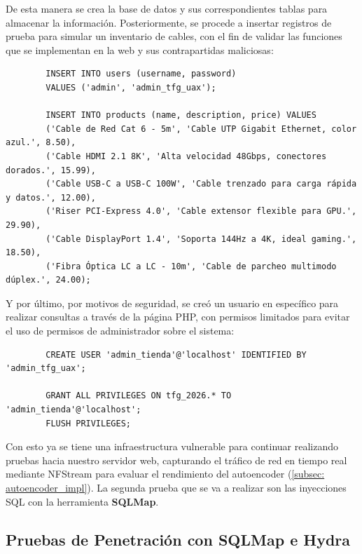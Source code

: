 \documentclass[12pt]{article}
\numberwithin{equation}{section} %
\begin{document}
    De esta manera se crea la base de datos y sus correspondientes tablas para almacenar la información. Posteriormente, se procede a insertar registros de prueba para simular un inventario de cables, con el fin de validar las funciones que se implementan en la web y sus contrapartidas maliciosas:

    \begin{verbatim}
        INSERT INTO users (username, password) 
        VALUES ('admin', 'admin_tfg_uax');

        INSERT INTO products (name, description, price) VALUES 
        ('Cable de Red Cat 6 - 5m', 'Cable UTP Gigabit Ethernet, color azul.', 8.50),
        ('Cable HDMI 2.1 8K', 'Alta velocidad 48Gbps, conectores dorados.', 15.99),
        ('Cable USB-C a USB-C 100W', 'Cable trenzado para carga rápida y datos.', 12.00),
        ('Riser PCI-Express 4.0', 'Cable extensor flexible para GPU.', 29.90),
        ('Cable DisplayPort 1.4', 'Soporta 144Hz a 4K, ideal gaming.', 18.50),
        ('Fibra Óptica LC a LC - 10m', 'Cable de parcheo multimodo dúplex.', 24.00);
    \end{verbatim}

    Y por último, por motivos de seguridad, se creó un usuario en específico para realizar consultas a través de la página PHP, con permisos limitados para evitar el uso de permisos de administrador sobre el sistema:
    
    \begin{verbatim}
        CREATE USER 'admin_tienda'@'localhost' IDENTIFIED BY 'admin_tfg_uax';

        GRANT ALL PRIVILEGES ON tfg_2026.* TO 'admin_tienda'@'localhost';
        FLUSH PRIVILEGES;
    \end{verbatim}

    Con esto ya se tiene una infraestructura vulnerable para continuar realizando pruebas hacia nuestro servidor web, capturando el tráfico de red en tiempo real mediante NFStream para evaluar el rendimiento del autoencoder (\ref{subsec: autoencoder_impl}). La segunda prueba que se va a realizar son las inyecciones SQL con la herramienta \textbf{SQLMap}.

    \vspace{10mm}

    



    \subsection{Pruebas de Penetración con SQLMap e Hydra}\label{subsec: pruebas_penetracion_sqlmap_hydra}
\end{document}
